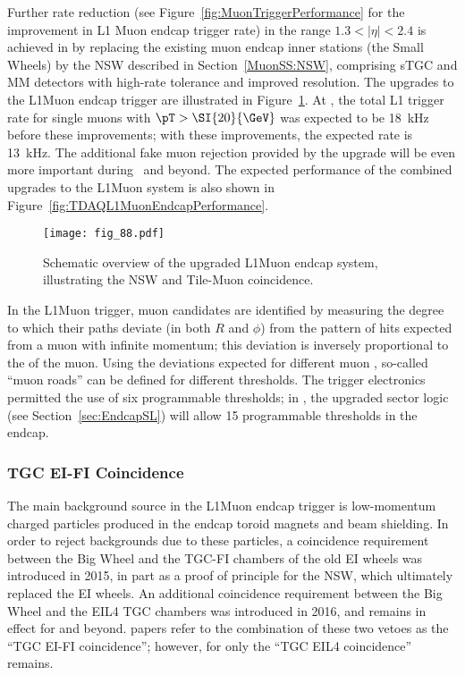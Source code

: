 \documentclass[cernpreprint, atlasdraft=false, UKenglish,british,orcidlogo, texmf, orcidlogo]{atlasdoc}
\begin{document}
Further rate reduction (see Figure~\ref{fig:MuonTriggerPerformance} for the improvement in \gls{L1} Muon endcap trigger rate) in the range $1.3 < |\eta| < 2.4$ is achieved in \RunThr by replacing the existing muon endcap inner stations (the Small Wheels) by the \gls{NSW} described in Section~\ref{MuonSS:NSW}, comprising \gls{sTGC} and \gls{MM} detectors with high-rate tolerance and improved resolution. The upgrades to the \gls{L1Muon} endcap trigger are illustrated in Figure~\ref{fig:TDAQL1MuonEndcapOverview}. At \lumirunthree, the total \gls{L1} trigger rate for single muons with $\pT > \SI{20}{\GeV}$ was expected to be \SI{18}{\kHz} before these improvements; with these improvements, the expected rate is \SI{13}{\kHz}. The additional fake muon rejection provided by the upgrade will be even more important during \RunFour\ and beyond. 
The expected performance of the combined upgrades to the \gls{L1Muon} system is also shown in Figure~\ref{fig:TDAQL1MuonEndcapPerformance}.
 
 
 
 
 
\begin{figure}[htbp!]
\centerline{\texttt{[image: fig\_88.pdf]}}
\caption{Schematic overview of the upgraded \gls{L1Muon} endcap system, illustrating the \gls{NSW} and Tile-Muon coincidence.}
\label{fig:TDAQL1MuonEndcapOverview}
\end{figure}
 
In the \gls{L1Muon} trigger, muon candidates are identified by measuring the degree to which their paths deviate (in both $R$ and $\phi$) from the pattern of hits expected from a muon with infinite momentum; this deviation is inversely proportional to the \pT of the muon.
Using the deviations expected for different muon \pT, so-called ``muon roads'' can be defined for different \pT thresholds.
The \RunTwo trigger electronics permitted the use of six programmable \pT thresholds; in \RunThr,  the upgraded sector logic (see Section~\ref{sec:EndcapSL}) will allow 15 programmable thresholds in the endcap.
 
\subsubsection{TGC EI-FI Coincidence}
The main background source in the \gls{L1Muon} endcap trigger is low-momentum charged particles produced in the endcap toroid magnets and beam shielding.
In order to reject backgrounds due to these particles, a coincidence requirement between the Big Wheel and the \gls{TGC-FI} chambers of the old \gls{EI} wheels was introduced in 2015, in part as a proof of principle for the \gls{NSW}, which ultimately replaced the \gls{EI} wheels.
An additional coincidence requirement between the Big Wheel and the \gls{EIL4} \gls{TGC} chambers was introduced in 2016, and remains in effect for \RunThr and beyond. \RunTwo papers refer to the combination of these two vetoes as the ``TGC EI-FI coincidence''; however, for \RunThr only the ``TGC EIL4 coincidence'' remains.
 
\end{document}
